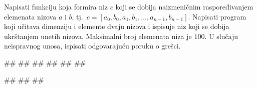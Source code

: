 \begin{Exercise}[label=v.ukrstanje_nizova]
Napisati funkciju  
koja formira niz $c$ koji se dobija naizmeničnim raspoređivanjem elemenata nizova $a$ i $b$, 
tj.~$c = [a_0, b_0, a_1, b_1, \ldots, a_{n-1}, b_{n-1}]$. 
Napisati program koji učitava dimenziju i elemente dvaju nizova i ispisuje niz koji se dobija
ukrštanjem unetih nizova. 
Maksimalni broj elemenata niza je $100$.
U slučaju neispravnog unosa, ispisati odgovarajuću poruku o grešci. 

\begin{miditest}
\begin{upotreba}{1}
#\naslovInt#
##
##
##
##
##
\end{upotreba}
\end{miditest}
\begin{miditest}
\begin{upotreba}{2}
#\naslovInt#
##
##
\end{upotreba}
\end{miditest}
\end{Exercise}

\ifresenja
\begin{Answer}[ref=v.ukrstanje_nizova]
\end{Answer}
\fi


